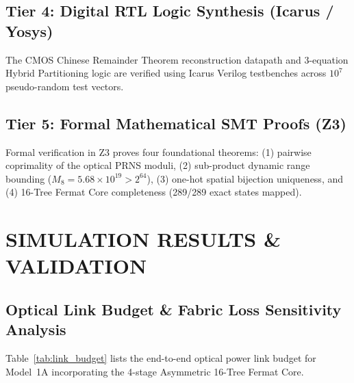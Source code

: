 \documentclass[journal]{IEEEtran}
\begin{document}
\subsection{Tier 4: Digital RTL Logic Synthesis (Icarus / Yosys)}
The CMOS Chinese Remainder Theorem reconstruction datapath and 3-equation Hybrid Partitioning logic are verified using Icarus Verilog testbenches across $10^7$ pseudo-random test vectors.

\subsection{Tier 5: Formal Mathematical SMT Proofs (Z3)}
Formal verification in Z3 \cite{DeMoura2008} proves four foundational theorems: (1) pairwise coprimality of the optical PRNS moduli, (2) sub-product dynamic range bounding ($M_8 = 5.68 \times 10^{19} > 2^{64}$), (3) one-hot spatial bijection uniqueness, and (4) 16-Tree Fermat Core completeness (289/289 exact states mapped).

\section{SIMULATION RESULTS \& VALIDATION}

\subsection{Optical Link Budget \& Fabric Loss Sensitivity Analysis}
Table~\ref{tab:link_budget} lists the end-to-end optical power link budget for Model~1A incorporating the 4-stage Asymmetric 16-Tree Fermat Core.
\end{document}
